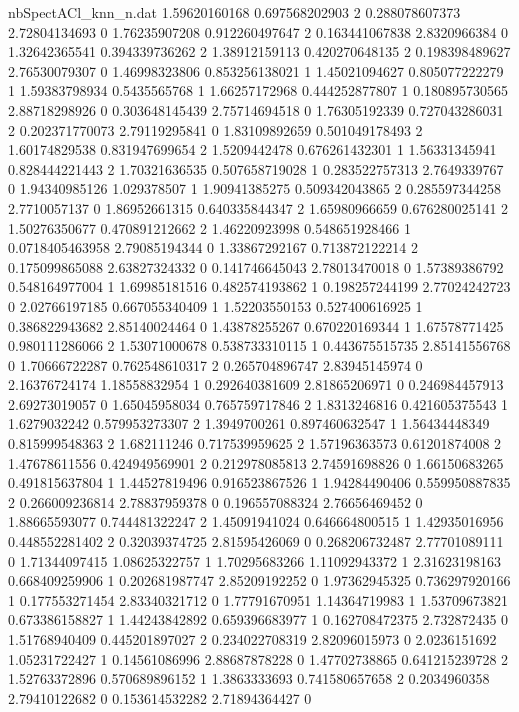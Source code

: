 \begin{filecontents}{nbSpectACl_knn_n.dat}
1.59620160168 0.697568202903 2
0.288078607373 2.72804134693 0
1.76235907208 0.912260497647 2
0.163441067838 2.8320966384 0
1.32642365541 0.394339736262 2
1.38912159113 0.420270648135 2
0.198398489627 2.76530079307 0
1.46998323806 0.853256138021 1
1.45021094627 0.805077222279 1
1.59383798934 0.5435565768 1
1.66257172968 0.444252877807 1
0.180895730565 2.88718298926 0
0.303648145439 2.75714694518 0
1.76305192339 0.727043286031 2
0.202371770073 2.79119295841 0
1.83109892659 0.501049178493 2
1.60174829538 0.831947699654 2
1.5209442478 0.676261432301 1
1.56331345941 0.828444221443 2
1.70321636535 0.507658719028 1
0.283522757313 2.7649339767 0
1.94340985126 1.029378507 1
1.90941385275 0.509342043865 2
0.285597344258 2.7710057137 0
1.86952661315 0.640335844347 2
1.65980966659 0.676280025141 2
1.50276350677 0.470891212662 2
1.46220923998 0.548651928466 1
0.0718405463958 2.79085194344 0
1.33867292167 0.713872122214 2
0.175099865088 2.63827324332 0
0.141746645043 2.78013470018 0
1.57389386792 0.548164977004 1
1.69985181516 0.482574193862 1
0.198257244199 2.77024242723 0
2.02766197185 0.667055340409 1
1.52203550153 0.527400616925 1
0.386822943682 2.85140024464 0
1.43878255267 0.670220169344 1
1.67578771425 0.980111286066 2
1.53071000678 0.538733310115 1
0.443675515735 2.85141556768 0
1.70666722287 0.762548610317 2
0.265704896747 2.83945145974 0
2.16376724174 1.18558832954 1
0.292640381609 2.81865206971 0
0.246984457913 2.69273019057 0
1.65045958034 0.765759717846 2
1.8313246816 0.421605375543 1
1.6279032242 0.579953273307 2
1.3949700261 0.897460632547 1
1.56434448349 0.815999548363 2
1.682111246 0.717539959625 2
1.57196363573 0.61201874008 2
1.47678611556 0.424949569901 2
0.212978085813 2.74591698826 0
1.66150683265 0.491815637804 1
1.44527819496 0.916523867526 1
1.94284490406 0.559950887835 2
0.266009236814 2.78837959378 0
0.196557088324 2.76656469452 0
1.88665593077 0.744481322247 2
1.45091941024 0.646664800515 1
1.42935016956 0.448552281402 2
0.32039374725 2.81595426069 0
0.268206732487 2.77701089111 0
1.71344097415 1.08625322757 1
1.70295683266 1.11092943372 1
2.31623198163 0.668409259906 1
0.202681987747 2.85209192252 0
1.97362945325 0.736297920166 1
0.177553271454 2.83340321712 0
1.77791670951 1.14364719983 1
1.53709673821 0.673386158827 1
1.44243842892 0.659396683977 1
0.162708472375 2.732872435 0
1.51768940409 0.445201897027 2
0.234022708319 2.82096015973 0
2.0236151692 1.05231722427 1
0.14561086996 2.88687878228 0
1.47702738865 0.641215239728 2
1.52763372896 0.570689896152 1
1.3863333693 0.741580657658 2
0.2034960358 2.79410122682 0
0.153614532282 2.71894364427 0

\end{filecontents}
